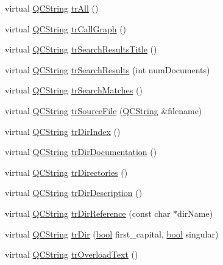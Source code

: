 \begin{DoxyCompactItemize}
\item 
virtual \hyperlink{class_q_c_string}{Q\+C\+String} \hyperlink{class_translator_dutch_a2a889af1a3cfcaec26294de4ecff96c2}{tr\+All} ()
\item 
virtual \hyperlink{class_q_c_string}{Q\+C\+String} \hyperlink{class_translator_dutch_a8328b25580e3288802d87346b5b0bae5}{tr\+Call\+Graph} ()
\item 
virtual \hyperlink{class_q_c_string}{Q\+C\+String} \hyperlink{class_translator_dutch_ace1774a60788aebb5da411cfd75d665c}{tr\+Search\+Results\+Title} ()
\item 
virtual \hyperlink{class_q_c_string}{Q\+C\+String} \hyperlink{class_translator_dutch_addfdb209e4f26e4898a6b9b1a1a821de}{tr\+Search\+Results} (int num\+Documents)
\item 
virtual \hyperlink{class_q_c_string}{Q\+C\+String} \hyperlink{class_translator_dutch_a1019f27a064742c6911e489f49425499}{tr\+Search\+Matches} ()
\item 
virtual \hyperlink{class_q_c_string}{Q\+C\+String} \hyperlink{class_translator_dutch_acb46528df3dbc065be0a80bd504c0648}{tr\+Source\+File} (\hyperlink{class_q_c_string}{Q\+C\+String} \&filename)
\item 
virtual \hyperlink{class_q_c_string}{Q\+C\+String} \hyperlink{class_translator_dutch_a8daeda058cfb5a2a97fe0c387cf3fd2e}{tr\+Dir\+Index} ()
\item 
virtual \hyperlink{class_q_c_string}{Q\+C\+String} \hyperlink{class_translator_dutch_a780d8c7a25dcfda02fe33eb683e3cef5}{tr\+Dir\+Documentation} ()
\item 
virtual \hyperlink{class_q_c_string}{Q\+C\+String} \hyperlink{class_translator_dutch_a43c7949f587066300f54e6e0c1cc6f39}{tr\+Directories} ()
\item 
virtual \hyperlink{class_q_c_string}{Q\+C\+String} \hyperlink{class_translator_dutch_ae85350288d46c358b611b9de4c17dfcc}{tr\+Dir\+Description} ()
\item 
virtual \hyperlink{class_q_c_string}{Q\+C\+String} \hyperlink{class_translator_dutch_a6c0a46fdb1c78958376f82593bab09a2}{tr\+Dir\+Reference} (const char $\ast$dir\+Name)
\item 
virtual \hyperlink{class_q_c_string}{Q\+C\+String} \hyperlink{class_translator_dutch_ab65f342d9a84d91f7dd3965cf0b05847}{tr\+Dir} (\hyperlink{qglobal_8h_a1062901a7428fdd9c7f180f5e01ea056}{bool} first\+\_\+capital, \hyperlink{qglobal_8h_a1062901a7428fdd9c7f180f5e01ea056}{bool} singular)
\item 
virtual \hyperlink{class_q_c_string}{Q\+C\+String} \hyperlink{class_translator_dutch_a996a6c89701df9c58ecaec5afef90d67}{tr\+Overload\+Text} ()

\end{DoxyCompactItemize}
